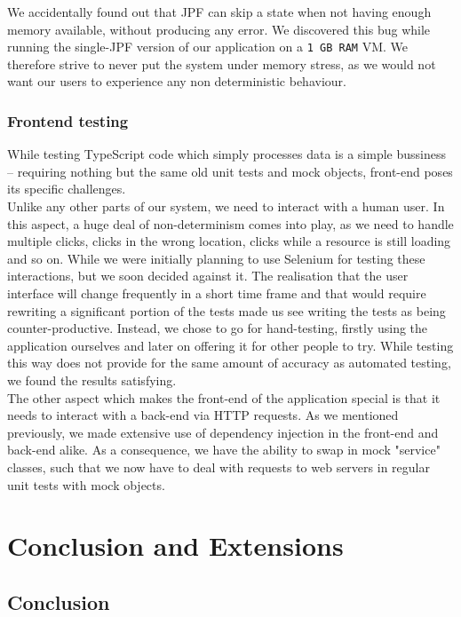 \documentclass[titlepage,11pt]{article}
\begin{document}
We accidentally found out that JPF can skip a state when not having enough memory available, without producing any error. We discovered this bug while running the single-JPF version of our application on a \texttt{1 GB RAM} VM. We therefore strive to never put the system under memory stress, as we would not want our users to experience any non deterministic behaviour.

\subsubsection{Frontend testing}

While testing TypeScript code which simply processes data is a simple bussiness -- requiring nothing but the same old unit tests and mock objects, front-end poses its specific challenges. \\

\noindent Unlike any other parts of our system, we need to interact with a human user. In this aspect, a huge deal of non-determinism comes into play, as we need to handle multiple clicks, clicks in the wrong location, clicks while a resource is still loading and so on. While we were initially planning to use Selenium for testing these interactions, but we soon decided against it. The realisation that the user interface will change frequently in a short time frame and that would require rewriting a significant portion of the tests made us see writing the tests as being counter-productive. Instead, we chose to go for hand-testing, firstly using the application ourselves and later on offering it for other people to try. While testing this way does not provide for the same amount of accuracy as automated testing, we found the results satisfying. \\

\noindent The other aspect which makes the front-end of the application special is that it needs to interact with a back-end via HTTP requests. As we mentioned previously, we made extensive use of dependency injection in the front-end and back-end alike. As a consequence, we have the ability to swap in mock "service" classes, such that we now have to deal with requests to web servers in regular unit tests with mock objects.

\section{Conclusion and Extensions}

\subsection{Conclusion}
\end{document}
